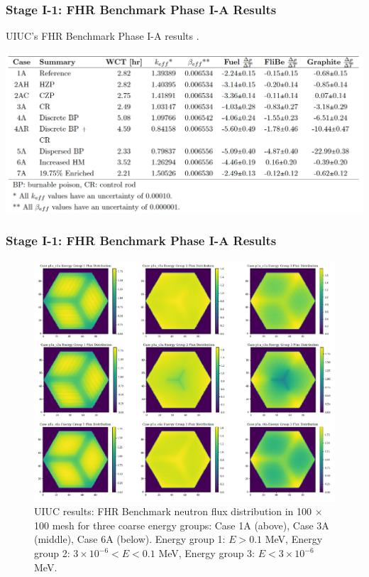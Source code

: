 \begin{frame}
    \frametitle{Stage I-1: FHR Benchmark Phase I-A Results}
    \begin{table}
        \caption{\acrlong{UIUC}'s \acrlong{FHR} Benchmark Phase I-A results 
        \cite{chee_arfcfhr-benchmark_2021}.}
        \includegraphics[width=\linewidth]{figures/benchmark-coeff-results.png} 
    \end{table}
\end{frame}

\begin{frame}
    \frametitle{Stage I-1: FHR Benchmark Phase I-A Results}
    \begin{figure}[]
        \centering
        \includegraphics[width=0.65\linewidth]{figures/phase1a-e.png} 
        \caption{UIUC results: FHR Benchmark neutron flux 
        distribution in 100 $\times$ 100 mesh for three coarse energy groups: Case 
        1A (above), Case 3A (middle), Case 6A (below). Energy group 1: $E > 0.1$ MeV, 
        Energy group 2: $3 \times 10^{-6} < E < 0.1$ MeV, Energy group 3: $E < 3 \times 10^{-6}$ MeV. }
    \end{figure}
\end{frame}